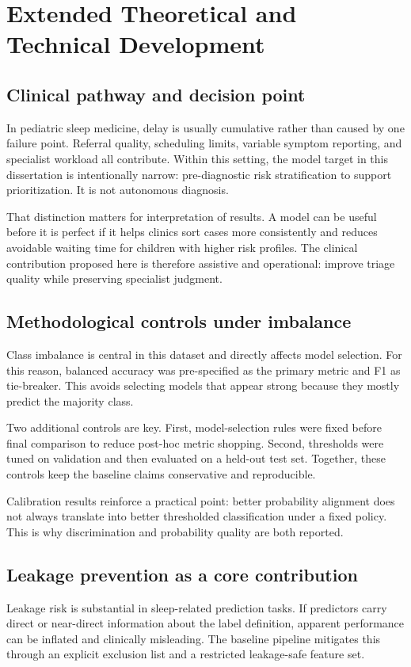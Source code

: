 \chapter{Extended Theoretical and Technical Development}

\section{Clinical pathway and decision point}
In pediatric sleep medicine, delay is usually cumulative rather than caused by one failure point. Referral quality, scheduling limits, variable symptom reporting, and specialist workload all contribute. Within this setting, the model target in this dissertation is intentionally narrow: pre-diagnostic risk stratification to support prioritization. It is not autonomous diagnosis.

That distinction matters for interpretation of results. A model can be useful before it is perfect if it helps clinics sort cases more consistently and reduces avoidable waiting time for children with higher risk profiles. The clinical contribution proposed here is therefore assistive and operational: improve triage quality while preserving specialist judgment.

\section{Methodological controls under imbalance}
Class imbalance is central in this dataset and directly affects model selection. For this reason, balanced accuracy was pre-specified as the primary metric and F1 as tie-breaker. This avoids selecting models that appear strong because they mostly predict the majority class.

Two additional controls are key. First, model-selection rules were fixed before final comparison to reduce post-hoc metric shopping. Second, thresholds were tuned on validation and then evaluated on a held-out test set. Together, these controls keep the baseline claims conservative and reproducible.

Calibration results reinforce a practical point: better probability alignment does not always translate into better thresholded classification under a fixed policy. This is why discrimination and probability quality are both reported.

\section{Leakage prevention as a core contribution}
Leakage risk is substantial in sleep-related prediction tasks. If predictors carry direct or near-direct information about the label definition, apparent performance can be inflated and clinically misleading. The baseline pipeline mitigates this through an explicit exclusion list and a restricted leakage-safe feature set.

